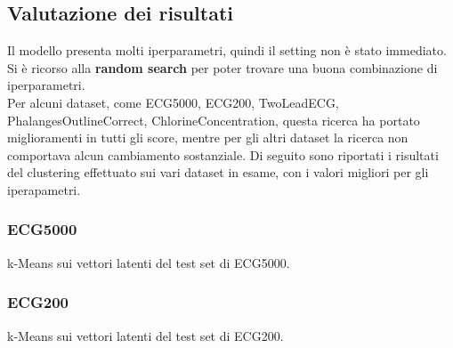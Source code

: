 \subsection{Valutazione dei risultati}
Il modello presenta molti iperparametri, quindi il setting non è stato immediato. Si è ricorso alla \textbf{random search} per poter trovare una buona combinazione di iperparametri.\\
Per alcuni dataset, come ECG5000, ECG200, TwoLeadECG, PhalangesOutlineCorrect, ChlorineConcentration, questa ricerca ha portato miglioramenti in tutti gli score, mentre per gli altri dataset la ricerca non comportava alcun cambiamento sostanziale.
Di seguito sono riportati i risultati del clustering effettuato sui vari dataset in esame, con i valori migliori per gli iperapametri.

\subsubsection{ECG5000}
\begin{center}
	\begin{table}[H]
		\centering
		\caption{k-Means sui vettori latenti del test set di ECG5000.}
	\end{table}
\end{center}

\subsubsection{ECG200}
\begin{center}
	\begin{table}[H]
		\centering
		\caption{k-Means sui vettori latenti del test set di ECG200.}
	\end{table}
\end{center}

